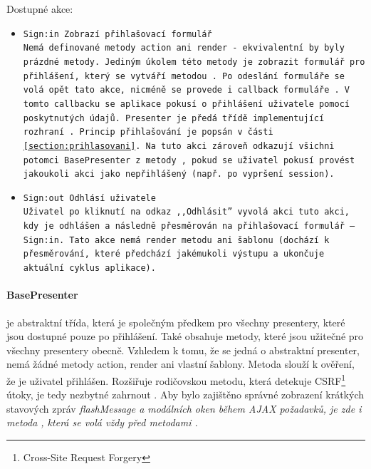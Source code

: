 Dostupné akce:
\begin{itemize}
	\item \tt{Sign:in} Zobrazí přihlašovací formulář\\
Nemá definované metody action ani render - ekvivalentní by byly prázdné metody. Jediným úkolem této metody je zobrazit formulář pro přihlášení, který se vytváří metodou . Po~odeslání formuláře se volá opět tato akce, nicméně se provede i callback formuláře . V tomto callbacku se aplikace pokusí o přihlášení uživatele pomocí poskytnutých údajů. Presenter je předá třídě implementující rozhraní . Princip přihlašování je popsán v části \ref{section:prihlasovani}. Na tuto akci zároveň odkazují všichni potomci BasePresenter z metody , pokud se uživatel pokusí provést jakoukoli akci jako nepřihlášený (např. po~vypršení session).
	\item \tt{Sign:out} Odhlásí uživatele\\
Uživatel po kliknutí na odkaz ,,Odhlásit'' vyvolá akci tuto akci, kdy je odhlášen a následně přesměrován na přihlašovací formulář -- \tt{Sign:in}. Tato akce nemá render metodu ani šablonu (dochází k přesměrování, které předchází jakémukoli výstupu a ukončuje aktuální cyklus aplikace).
\end{itemize}


\paragraph{BasePresenter} je abstraktní třída, která je společným předkem pro všechny presentery, které jsou dostupné pouze po přihlášení. Také obsahuje metody, které jsou užitečné pro všechny presentery obecně. Vzhledem k tomu, že se jedná o abstraktní presenter, nemá žádné metody action, render ani vlastní šablony. 
Metoda  slouží k ověření, že je uživatel přihlášen. Rozšiřuje rodičovskou metodu, která detekuje CSRF\footnote{Cross-Site Request Forgery} útoky, je tedy nezbytné zahrnout %
. Aby bylo zajištěno správné zobrazení krátkých stavových zpráv \it{flashMessage} a modálních oken během AJAX požadavků, je zde i metoda , která se volá vždy před metodami .


